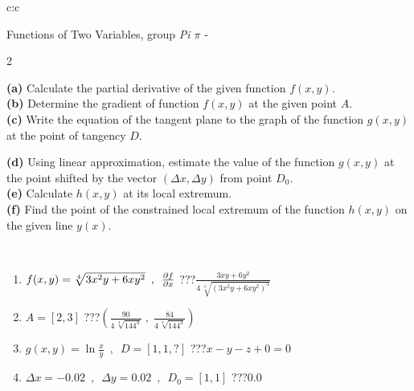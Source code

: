 \documentclass[10pt]{report}
\begin{document}
\begin{tabular}{c:c}
\begin{minipage}[c][104.5mm][t]{0.5\linewidth}
\begin{center}
\vspace{7mm}
{\huge \LARGE Functions of Two Variables, group \textit{Pi $\pi$} -}\\[5mm]
\begin{minipage}{0.95\linewidth}
\begin{center}
{\small \begin{multicols}{2} \raggedright
\textbf{(a)} Calculate the partial derivative of the given function \(f(x,y)\). \\[1mm]
\textbf{(b)} Determine the gradient of function \(f(x,y)\) at the given point \(A\). \\[1mm]
\textbf{(c)} Write the equation of the tangent plane to the graph of the function \(g(x,y)\) at the point of tangency \(D\). \par \columnbreak
\textbf{(d)} Using linear approximation, estimate the value of the function \(g(x,y)\) at the point shifted by the vector \((\Delta x, \Delta y)\) from point \(D_0\). \\[1mm]
\textbf{(e)} Calculate \(h(x,y)\) at its local extremum. \\[1mm]
\textbf{(f)} Find the point of the constrained local extremum of the function \(h(x,y)\) on the given line \(y(x)\). \\[1mm]
\end{multicols}
}
\end{center}
\end{minipage}
\\[4mm]
\begin{minipage}{0.79\linewidth}
\begin{center}
\begin{varwidth}{\linewidth}
\begin{enumerate}
\normalsizerr
\item $f(x,y) = \sqrt[4]{3x^2y + 6xy^2}\enspace , \enspace \pdv{f}{x}$\quad \dotfill\; ???\;\dotfill \quad $\frac{3xy+6y^2}{4\,\sqrt[4]{(3x^2y+6xy^2)^{3}}}$
\item $A = [2, 3]$\quad \dotfill\; ???\;\dotfill \quad $\left( \frac{90}{4\,\sqrt[4]{144^3}} \;,\; \frac{84}{4\,\sqrt[4]{144^3}} \right)$
\item $g(x,y) = \ln\frac{x}{y} \enspace , \enspace D=[1,1,?]$\quad \dotfill\; ???\;\dotfill \quad $x - y - z + 0 = 0$
\item $\Delta x = {-0.02} \enspace,\enspace \Delta y = {0.02} \enspace,\enspace D_0 = [1,1]$\quad \dotfill\; ???\;\dotfill \quad $0.0$

\end{enumerate}
\end{varwidth}
\end{center}
\end{minipage}
\end{center}
\end{minipage}
\end{tabular}
\end{document}
